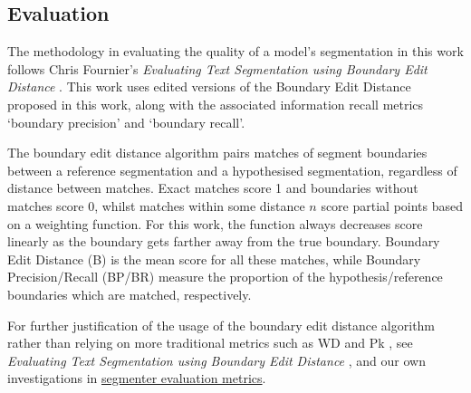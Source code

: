 \subsection{Evaluation}

The methodology in evaluating the quality of a model’s segmentation in this work follows Chris Fournier's \emph{Evaluating Text Segmentation using Boundary Edit Distance} \cite{fournier-2013-B}. This work uses edited versions of the Boundary Edit Distance proposed in this work, along with the associated information recall metrics ‘boundary precision’ and ‘boundary recall’. 

The boundary edit distance algorithm pairs matches of segment boundaries between a reference segmentation and a hypothesised segmentation, regardless of distance between matches. Exact matches score 1 and boundaries without matches score 0, whilst matches within some distance $n$ score partial points based on a weighting function. For this work, the function always decreases score linearly as the boundary gets farther away from the true boundary. Boundary Edit Distance (B) is the mean score for all these matches, while Boundary Precision/Recall (BP/BR) measure the proportion of the hypothesis/reference boundaries which are matched, respectively. 

For further justification of the usage of the boundary edit distance algorithm rather than relying on more traditional metrics such as WD and Pk \cite{HearstW2002}, see \emph{Evaluating Text Segmentation using Boundary Edit Distance}  \cite{fournier-2013-B}, and our own investigations in \href{https://github.com/PierreRL/segmenter-evaluation-metrics}{segmenter evaluation metrics}.